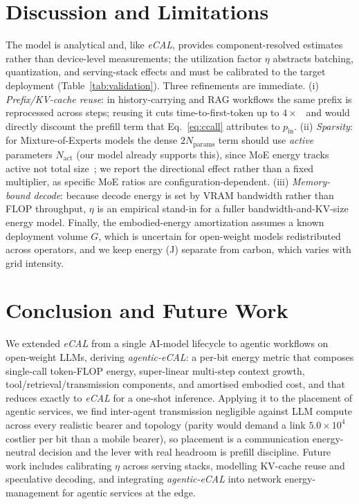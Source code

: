 \documentclass[journal]{IEEEtran}
\newif\ifshowchanges \showchangestrue
\newcommand{\NEW}{\ifshowchanges\color{blue}\fi}
\newcommand{\OLD}{\ifshowchanges\color{black}\fi}
\newcommand{\parityFactor}{\ensuremath{5.0\times10^{4}}}%
\newcommand{\agecal}{\textit{agentic-eCAL}}
\newcommand{\ecal}{\textit{eCAL}}
\begin{document}
\section{Discussion and Limitations}\label{sec:discussion}
The model is analytical and, like \ecal{}, provides component-resolved estimates rather than
device-level measurements; the utilization factor $\eta$ abstracts batching, quantization, and
serving-stack effects and must be calibrated to the target deployment (Table~\ref{tab:validation}).
Three refinements are immediate. (i) \emph{Prefix/KV-cache reuse}: in history-carrying and RAG
workflows the same prefix is reprocessed across steps; reusing it cuts time-to-first-token up to
$4\times$~\cite{ragcache2024} and would directly discount the prefill term that Eq.~\eqref{eq:ccall}
attributes to $p_{\mathrm{in}}$. (ii) \emph{Sparsity}: for Mixture-of-Experts models the dense $2N_{\mathrm{params}}$
term should use \emph{active} parameters $N_{\mathrm{act}}$ (our model already supports this), since
MoE energy tracks active not total size~\cite{mlenergy_v3}; we report the directional effect rather
than a fixed multiplier, as specific MoE ratios are configuration-dependent. (iii) \emph{Memory-bound
decode}: because decode energy is set by VRAM bandwidth rather than FLOP throughput, $\eta$ is an
empirical stand-in for a fuller bandwidth-and-KV-size energy model. Finally, the embodied-energy
amortization assumes a known deployment volume $G$, which is uncertain for open-weight models
redistributed across operators, and we keep energy (J) separate from carbon, which varies with grid
intensity.

\section{Conclusion and Future Work}\label{sec:conclusion}
We extended \ecal{} from a single AI-model lifecycle to agentic workflows on open-weight LLMs,
deriving \agecal{}: a per-bit energy metric that composes single-call token-FLOP energy, super-linear
multi-step context growth, tool/retrieval/transmission components, and amortised embodied cost, and
that reduces exactly to \ecal{} for a one-shot inference. \NEW Applying it to the placement of
agentic services, we find inter-agent transmission negligible against LLM compute across every
realistic bearer and topology (parity would demand a link \parityFactor{} costlier per bit than a
mobile bearer), so placement is a communication energy-neutral decision and the lever with real headroom is
prefill discipline.\OLD{} Future work includes calibrating $\eta$
across serving stacks, modelling KV-cache reuse and speculative decoding, and integrating \agecal{}
into network energy-management for agentic services at the edge.



\end{document}
